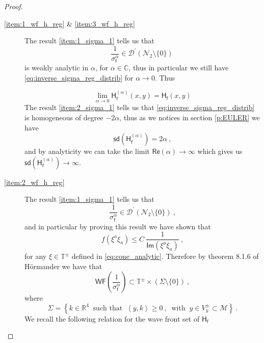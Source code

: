 \documentclass[11pt]{book}
\newcommand{\WF}{\mathsf{WF}}
\newcommand{\sd}{\mathsf{sd}}
\renewcommand{\Re}{\mathsf{Re}}
\renewcommand{\Im}{\mathsf{Im}}
\newcommand{\sm}[1]{\left\langle#1\right\rangle}
\newcommand{\Dcal}{\mathcal{D}}
\newcommand{\Mcal}{\mathcal{M}}
\newcommand{\Ncal}{\mathcal{N}}
\newcommand{\Cbb}{\mathbb{C}}
\newcommand{\Rbb}{\mathbb{R}}
\newcommand{\Tbb}{\mathbb{T}}
\newcommand{\Hsf}{\mathsf{H}}
\newcommand{\fsf}{\mathsf{f}}
\theoremstyle{break}
\begin{document}
\begin{proof}
\begin{description}
\item[\ref{item:1_wf_h_reg} \& \ref{item:3_wf_h_reg}] 
%
The result \ref{item:1_sigma_1} tells us that 
%
\begin{equation*}
\frac{1}{\sigma_\fsf^\alpha} \in \Dcal^\prime(\Ncal_2\setminus\{0\}) \
\label{eq:inverse_sigma_reg_distrib}
\end{equation*}
%
is weakly analytic in $\alpha$, for $\alpha\in\Cbb$, thus in particular we still have \eqref{eq:inverse_sigma_reg_distrib} for $\alpha\to0$. Thus

\begin{equation*}
\lim_{\alpha\to0} \Hsf^{(\alpha)}_\fsf(x,y) = \Hsf_\fsf(x,y) 
\end{equation*}
%
The result \ref{item:2_sigma_1} tells us that \eqref{eq:inverse_sigma_reg_distrib} is homogeneous of degree $-2\alpha$, thus as we notices in section \ref{p:EULER} we have 
%
\begin{equation*}
\sd(\Hsf^{(\alpha)}_\fsf) = 2\alpha \ ,
\end{equation*}
%
and by analyticity we can take the limit $\Re(\alpha) \to \infty$ which gives us $\sd(\Hsf^{(\alpha)}_\fsf)\to\infty$.
%
%
\item[\ref{item:2_wf_h_reg}] 
%
The result \ref{item:1_sigma_1} tells us that 
%
\begin{equation*}
\frac{1}{\sigma_\fsf^\alpha} \in \Dcal^\prime(\Ncal_2\setminus\{0\}) \ ,
\end{equation*}
%
and in particular by proving this result we have shown that
%
\begin{equation*}
f(\xi^a\xi_{a}) \leq C \ \frac{1}{\Im(\xi^{a}\xi_{a})} \ , 
\end{equation*}
%
for any $\xi \in \Tbb^\pm$ defined in \eqref{eq:cone_analytic}. Therefore by theorem 8.1.6 of Hörmander \cite{HORMANDER_1990} we have that 
%
\begin{equation}
\WF\left(\frac{1}{\sigma_\fsf^\alpha}\right) \subset  \Tbb^\pm \times \left( \Sigma \setminus \{0\} \right) \ ,
\label{eq:wf_invers_sigma_in_v+-}
\end{equation}
%
where
%
\begin{equation*}
\Sigma = \left\{ k \in \Rbb^4 \ \mbox{ such that } \ \sm{y,k} \geq 0 \ , \ \mbox{ with } \ y \in V^\pm_y \subset \Mcal \right\} \ . 
\end{equation*}
%
We recall the following relation for the wave front set of $\Hsf_\fsf$
%
\begin{equation*}

\end{equation*}
\end{description}
\end{proof}
\end{document}
